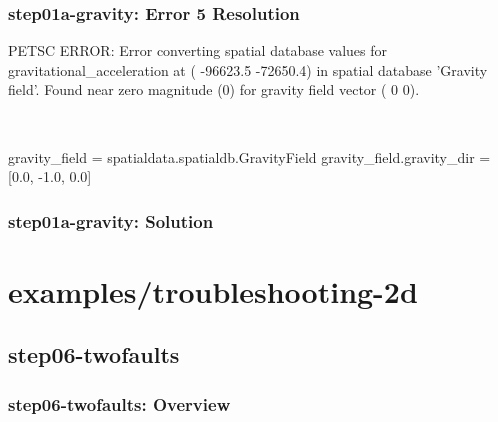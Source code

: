 \documentclass[aspectratio=169]{beamer}
\begin{document}
\begin{frame}[t,fragile]
  \frametitle{{\ttfamily step01a-gravity}: Error 5 Resolution}

  \tserror
  \begin{bashcode}
[0]PETSC ERROR: Error converting spatial database values for gravitational_acceleration at (  -96623.5  -72650.4) in
spatial database 'Gravity field'. Found near zero magnitude (0) for gravity field vector (  0  0).
  \end{bashcode}

  \pause\\[1pt]

  \begin{cfgcode}
    gravity_field = spatialdata.spatialdb.GravityField
    gravity_field.gravity_dir = [0.0, -1.0, 0.0]
  \end{cfgcode}

\end{frame}


\begin{frame}[fragile]
  \frametitle{{\ttfamily step01a-gravity}: Solution}

  
\end{frame}


\section{{\ttfamily examples/troubleshooting-2d}}
\subsection{{\ttfamily step06-twofaults}}

\begin{frame}[fragile]
  \frametitle{{\ttfamily step06-twofaults}: Overview}


  
\end{frame}
\end{document}
